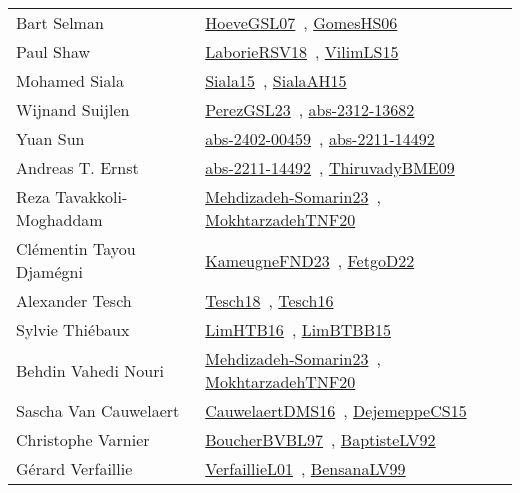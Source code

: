 {\begin{longtable}{p{4cm}p{20cm}}
Bart Selman & \href{works/HoeveGSL07.pdf}{HoeveGSL07}~\cite{HoeveGSL07}, \href{works/GomesHS06.pdf}{GomesHS06}~\cite{GomesHS06}\\
Paul Shaw & \href{works/LaborieRSV18.pdf}{LaborieRSV18}~\cite{LaborieRSV18}, \href{works/VilimLS15.pdf}{VilimLS15}~\cite{VilimLS15}\\
Mohamed Siala & \href{works/Siala15.pdf}{Siala15}~\cite{Siala15}, \href{works/SialaAH15.pdf}{SialaAH15}~\cite{SialaAH15}\\
Wijnand Suijlen & \href{works/PerezGSL23.pdf}{PerezGSL23}~\cite{PerezGSL23}, \href{works/abs-2312-13682.pdf}{abs-2312-13682}~\cite{abs-2312-13682}\\
Yuan Sun & \href{works/abs-2402-00459.pdf}{abs-2402-00459}~\cite{abs-2402-00459}, \href{works/abs-2211-14492.pdf}{abs-2211-14492}~\cite{abs-2211-14492}\\
Andreas T. Ernst & \href{works/abs-2211-14492.pdf}{abs-2211-14492}~\cite{abs-2211-14492}, \href{works/ThiruvadyBME09.pdf}{ThiruvadyBME09}~\cite{ThiruvadyBME09}\\
Reza Tavakkoli{-}Moghaddam & \href{works/Mehdizadeh-Somarin23.pdf}{Mehdizadeh-Somarin23}~\cite{Mehdizadeh-Somarin23}, \href{works/MokhtarzadehTNF20.pdf}{MokhtarzadehTNF20}~\cite{MokhtarzadehTNF20}\\
Cl{\'{e}}mentin Tayou Djam{\'{e}}gni & \href{works/KameugneFND23.pdf}{KameugneFND23}~\cite{KameugneFND23}, \href{works/FetgoD22.pdf}{FetgoD22}~\cite{FetgoD22}\\
Alexander Tesch & \href{works/Tesch18.pdf}{Tesch18}~\cite{Tesch18}, \href{works/Tesch16.pdf}{Tesch16}~\cite{Tesch16}\\
Sylvie Thi{\'{e}}baux & \href{works/LimHTB16.pdf}{LimHTB16}~\cite{LimHTB16}, \href{works/LimBTBB15.pdf}{LimBTBB15}~\cite{LimBTBB15}\\
Behdin Vahedi Nouri & \href{works/Mehdizadeh-Somarin23.pdf}{Mehdizadeh-Somarin23}~\cite{Mehdizadeh-Somarin23}, \href{works/MokhtarzadehTNF20.pdf}{MokhtarzadehTNF20}~\cite{MokhtarzadehTNF20}\\
Sascha Van Cauwelaert & \href{works/CauwelaertDMS16.pdf}{CauwelaertDMS16}~\cite{CauwelaertDMS16}, \href{works/DejemeppeCS15.pdf}{DejemeppeCS15}~\cite{DejemeppeCS15}\\
Christophe Varnier & \href{}{BoucherBVBL97}~\cite{BoucherBVBL97}, \href{works/BaptisteLV92.pdf}{BaptisteLV92}~\cite{BaptisteLV92}\\
G{\'{e}}rard Verfaillie & \href{works/VerfaillieL01.pdf}{VerfaillieL01}~\cite{VerfaillieL01}, \href{works/BensanaLV99.pdf}{BensanaLV99}~\cite{BensanaLV99}\\

\end{longtable}}
